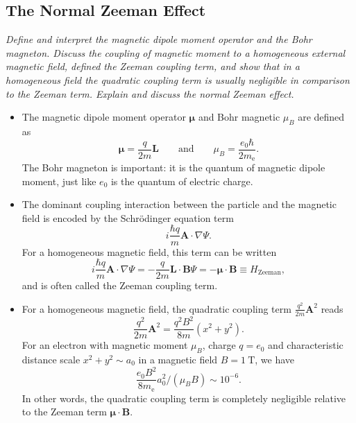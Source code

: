 \documentclass[11pt, a4paper]{article}
\renewcommand{\grad}{\nabla}
\newcommand{\eqtext}[1]{\qquad \text{#1} \qquad}
\newcommand{\Schro}{Schr\"{o}dinger\xspace}
\renewcommand{\vec}[1]{\bm{#1}}  %
\renewcommand{\L}{\vec{L}}  %
\newcommand{\A}{\vec{A}}  %
\newcommand{\B}{\vec{B}}  %
\newcommand{\m}{\vec{\mu}}  %
\renewcommand{\P}{\Psi}  %
\begin{document}
\subsection{The Normal Zeeman Effect}
\textit{Define and interpret the magnetic dipole moment operator and the Bohr magneton. Discuss the coupling of magnetic moment to a homogeneous external magnetic field, defined the Zeeman coupling term, and show that in a homogeneous field the quadratic coupling term is usually negligible in comparison to the Zeeman term. Explain and discuss the normal Zeeman effect.}

\begin{itemize}

	\item The magnetic dipole moment operator $ \m $ and Bohr magnetic $ \mu_{B} $ are defined as
	\begin{equation*}
		\m = \frac{q}{2m}\L \eqtext{and} \mu_{B} = \frac{e_{0}\hbar}{2m_{\text{e}}}.
	\end{equation*}
	The Bohr magneton is important: it is the quantum of magnetic dipole moment, just like $ e_{0} $ is the quantum of electric charge.


    \item The dominant coupling interaction between the particle and the magnetic field is encoded by the \Schro equation term
    \begin{equation*}
        i \frac{\hbar q}{m} \A \cdot \grad \P.
    \end{equation*}
    For a homogeneous magnetic field, this term can be written
    \begin{equation*}
        i \frac{\hbar q}{m} \A \cdot \grad \P = - \frac{q}{2m}\L \cdot \B \P = - \m \cdot \B \equiv H_{\text{Zeeman}},
    \end{equation*}
    and is often called the Zeeman coupling term.
    
	\item For a homogeneous magnetic field, the quadratic coupling term $ \frac{q^{2}}{2m}\A^{2} $ reads
    \begin{equation*}
        \frac{q^{2}}{2m}\A^{2} = \frac{q^{2}B^{2}}{8 m}(x^{2} + y^{2}).
    \end{equation*}
	For an electron with magnetic moment $ \mu_{B}$, charge $ q = e_{0} $ and characteristic distance scale $ x^{2} + y^{2} \sim a_{0} $ in a magnetic field $ B = \SI{1}{\tesla} $, we have
	\begin{equation*}
		\frac{e_{0}B^{2}}{8m_{\text{e}}}a_{0}^{2} \Big / (\mu_{B}B) \sim 10^{-6}.
	\end{equation*}
	In other words, the quadratic coupling term is completely negligible relative to the Zeeman term $ \m \cdot \B $. 


\end{itemize}
\end{document}
